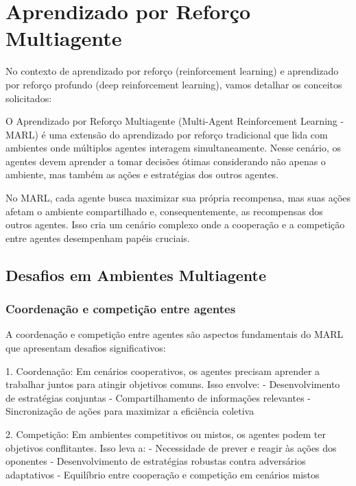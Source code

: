 \section{Aprendizado por Reforço Multiagente}
\label{sec:marl}

No contexto de aprendizado por reforço (reinforcement learning) e aprendizado por reforço profundo (deep reinforcement learning), vamos detalhar os conceitos solicitados:

O Aprendizado por Reforço Multiagente (Multi-Agent Reinforcement Learning - MARL) é uma extensão do aprendizado por reforço tradicional que lida com ambientes onde múltiplos agentes interagem simultaneamente\cite{https://arxiv.org/abs/2412.21088,https://arxiv.org/abs/2401.10949}. Nesse cenário, os agentes devem aprender a tomar decisões ótimas considerando não apenas o ambiente, mas também as ações e estratégias dos outros agentes.

No MARL, cada agente busca maximizar sua própria recompensa, mas suas ações afetam o ambiente compartilhado e, consequentemente, as recompensas dos outros agentes\cite{https://www.semanticscholar.org/paper/c6c4198ac541ce339e76feb8ca2de813acb87fc2}. Isso cria um cenário complexo onde a cooperação e a competição entre agentes desempenham papéis cruciais.

\subsection{Desafios em Ambientes Multiagente}
\label{subsec:desafios_multi}

\subsubsection{Coordenação e competição entre agentes}
\label{subsubsec:coordenacao}

A coordenação e competição entre agentes são aspectos fundamentais do MARL que apresentam desafios significativos:

1. Coordenação: Em cenários cooperativos, os agentes precisam aprender a trabalhar juntos para atingir objetivos comuns\cite{https://arxiv.org/abs/2410.21290}. Isso envolve:
   - Desenvolvimento de estratégias conjuntas
   - Compartilhamento de informações relevantes
   - Sincronização de ações para maximizar a eficiência coletiva

2. Competição: Em ambientes competitivos ou mistos, os agentes podem ter objetivos conflitantes\cite{https://www.semanticscholar.org/paper/c6c4198ac541ce339e76feb8ca2de813acb87fc2}. Isso leva a:
   - Necessidade de prever e reagir às ações dos oponentes
   - Desenvolvimento de estratégias robustas contra adversários adaptativos
   - Equilíbrio entre cooperação e competição em cenários mistos

